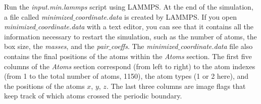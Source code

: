 \documentclass[9pt,tutorial]{livecoms}
\begin{document}
Run the \textit{input.min.lammps} script using LAMMPS. At the end of the simulation, a file called \textit{minimized$\_$coordinate.data} is created by LAMMPS. If you open \textit{minimized$\_$coordinate.data} with a text editor, you can see that it contains all the information necessary to restart the simulation, such as the number of atoms, the box size, the \textit{masses}, and the \textit{pair$\_$coeffs}. The \textit{minimized$\_$coordinate.data} file also contains the final positions of the atoms within the \textit{Atoms} section. The first five columns of the \textit{Atoms} section correspond (from left to right) to the atom indexes (from 1 to the total number of atoms, 1150), the atom types (1 or 2 here), and the positions of the atoms $x$, $y$, $z$. The last three columns are image flags that keep track of which atoms crossed the periodic boundary.
\end{document}
